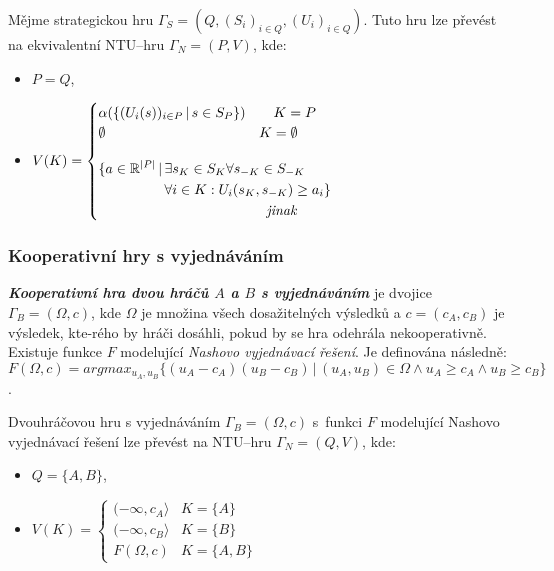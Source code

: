             Mějme strategickou hru $\Gamma_S = (Q, (S_i)_{i\in Q}, (U_i)_{i\in Q})$. Tuto hru lze převést na ekvivalentní NTU--hru $\Gamma_N = (P, V)$, kde:
            \begin{itemize}
                \item $P = Q$,
                \item $V(K) = \begin{cases}
                    \alpha(\{(U_i(s))_{i\in P}\,|\,s \in S_P\}) \hspace*{2em} K = P\\
                    \emptyset \hspace*{11em} K = \emptyset \\[1.2em]
                    \begin{aligned}
                        \{a \in \mathbb{R}^{|P|}\,|\,&\exists s_K \in S_K \forall s_{-K} \in S_{-K}\\
                        &\forall i \in K: U_i(s_K, s_{-K}) \geq a_i\}\\
                        &\hspace*{7.3em}\textit{jinak}
                    \end{aligned}
                \end{cases}$
            \end{itemize}

        \subsubsection*{Kooperativní hry s vyjednáváním}
            \textit{\textbf{Kooperativní hra dvou hráčů $A$ a $B$ s vyjednáváním}} \cite{Hruby2022} je dvojice $\Gamma_B = (\Omega, c)$, kde $\Omega$ je množina všech dosažitelných výsledků a $c = (c_A, c_B)$ je výsledek, kte-rého by hráči dosáhli, pokud by se hra odehrála nekooperativně.  Existuje funkce $F$ modelující \textit{Nashovo vyjednávací řešení}. Je definována následně: $F(\Omega, c) = arg max_{u_A, u_B}\{(u_A - c_A)(u_B - c_B)\,|\, (u_A, u_B) \in \Omega \land u_A \geq c_A \land u_B \geq c_B\}$.

            Dvouhráčovou hru s vyjednáváním $\Gamma_B = (\Omega, c)$ s~funkci $F$ modelující Nashovo vyjednávací řešení lze převést na NTU--hru $\Gamma_N = (Q, V)$, kde:

            \begin{itemize}
                \item $Q = \{A, B\}$,
                \item $V(K) = \begin{cases}
                    (-\infty, c_A\rangle & K = \{A\}\\
                    (-\infty, c_B\rangle & K = \{B\}\\
                    F(\Omega, c) & K = \{A, B\}
                \end{cases}$
            \end{itemize}
